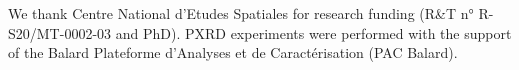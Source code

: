 

We thank Centre National d'Etudes Spatiales for research funding (R\&T n°
R-S20/MT-0002-03 and PhD). PXRD experiments were performed with the support of
the Balard Plateforme d’Analyses et de Caractérisation (PAC Balard).